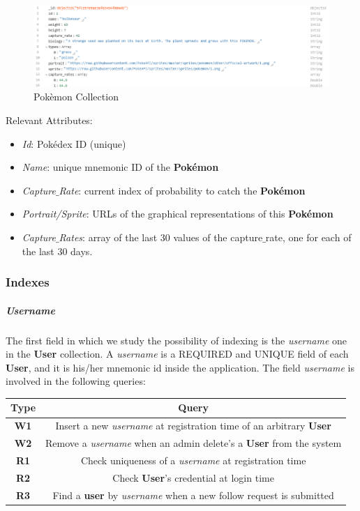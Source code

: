 \begin{figure}[H]
	\centering
	\includegraphics[width=\textwidth]{img/pokemon_collection.png}
	\caption{Pokèmon Collection}
\end{figure}
Relevant Attributes:
\begin{itemize}
	\item \textit{Id}: Pokédex ID (unique)
	\item \textit{Name}: unique mnemonic ID of the \textbf{Pokémon}
	\item \textit{Capture$\_$Rate}: current index of probability to catch the \textbf{Pokémon}
	\item \textit{Portrait/Sprite}: URLs of the graphical representations of this \textbf{Pokémon}
	\item \textit{Capture$\_$Rates}: array of the last 30 values of the capture$\_$rate, one for each of the last 30 days.
\end{itemize}

\subsubsection{Indexes}

\subparagraph{Username}
The first field in which we study the possibility of indexing is the \textit{username} one in the \textbf{User} collection. A \textit{username} is a REQUIRED and UNIQUE field of each \textbf{User}, and it is his/her mnemonic id inside the application.
The field \textit{username} is involved in the following queries:
\begin{center}
	\begin{tabular}{|c | c |} 
		\hline
		\textbf{Type} & \textbf{Query} \\ [0.5ex] 
		\hline
		\textbf{W1} & Insert a new \textit{username} at registration time of an arbitrary \textbf{User} \\ 
		\hline
		\textbf{W2} & Remove a \textit{username} when an admin delete’s a \textbf{User} from the system \\
		\hline
		\textbf{R1} & Check uniqueness of a \textit{username} at registration time \\
		\hline
		\textbf{R2} & Check \textbf{User}’s credential at login time \\
		\hline
		\textbf{R3} & \colorbox{BurntOrange}{Find a \textbf{user} by \textit{username} when a new follow request is submitted} \\
		\hline
	\end{tabular}
\end{center}

